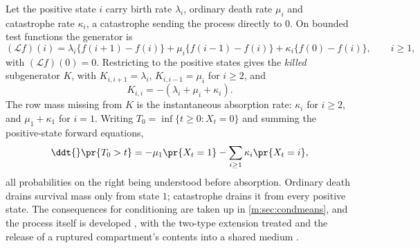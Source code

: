 Let the positive state $i$ carry
birth rate $\lambda_i$, ordinary death rate $\mu_i$ and catastrophe rate
$\kappa_i$, a catastrophe sending the process directly to $0$. On bounded test
functions the generator is
\begin{equation}
\label{m:eq:bdcgenerator}
(\mathcal Lf)(i)
= \lambda_i\{f(i+1)-f(i)\} + \mu_i\{f(i-1)-f(i)\} + \kappa_i\{f(0)-f(i)\},
\qquad i\ge1,
\end{equation}
with $(\mathcal Lf)(0)=0$. Restricting to the positive states gives the
\emph{killed} subgenerator $K$, with $K_{i,i+1}=\lambda_i$, $K_{i,i-1}=\mu_i$ for
$i\ge2$, and
\begin{equation}
\label{m:eq:killedsubgen}
K_{i,i} = -(\lambda_i+\mu_i+\kappa_i) .
\end{equation}
The row mass missing from $K$ is the instantaneous absorption rate: $\kappa_i$ for
$i\ge2$, and $\mu_1+\kappa_1$ for $i=1$. Writing $T_0=\inf\{t\ge0:X_t=0\}$ and
summing the positive-state forward equations,
\begin{equation}
\label{m:eq:bdcsurvivalloss}
\ddt{}\pr{T_0>t}
= -\mu_1\pr{X_t=1} - \sum_{i\ge1}\kappa_i\pr{X_t=i},
\end{equation}
all probabilities on the right being understood before absorption. Ordinary death
drains survival mass only from state $1$; catastrophe drains it from every positive
state. The
consequences for conditioning are taken up in \cref{m:sec:condmeans}, and the
process itself is developed , with the two-type extension treated
 and the release of a
ruptured compartment's contents into a shared medium
.

